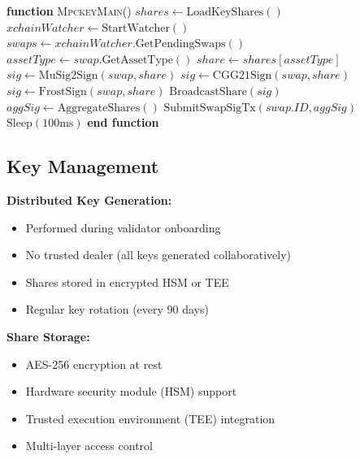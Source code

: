 \documentclass[11pt]{article}
\begin{document}
\begin{algorithmic}[1]
\State \textbf{function} \textsc{MpckeyMain}()
    \State $shares \gets \text{LoadKeyShares}()$
    \State $xchainWatcher \gets \text{StartWatcher}()$
    \State
        \State $swaps \gets xchainWatcher.\text{GetPendingSwaps}()$
            \State $assetType \gets swap.\text{GetAssetType}()$
            \State $share \gets shares[assetType]$
            \State
                \State $sig \gets \text{MuSig2Sign}(swap, share)$
                \State $sig \gets \text{CGG21Sign}(swap, share)$
                \State $sig \gets \text{FrostSign}(swap, share)$
            \EndIf
            \State
            \State $\text{BroadcastShare}(sig)$
            \State
                \State $aggSig \gets \text{AggregateShares}()$
                \State $\text{SubmitSwapSigTx}(swap.ID, aggSig)$
            \EndIf
        \EndFor
        \State $\text{Sleep}(100\text{ms})$
    \EndWhile
\State \textbf{end function}
\end{algorithmic}


\subsection{Key Management}

\textbf{Distributed Key Generation:}
\begin{itemize}
\item Performed during validator onboarding
\item No trusted dealer (all keys generated collaboratively)
\item Shares stored in encrypted HSM or TEE
\item Regular key rotation (every 90 days)
\end{itemize}

\textbf{Share Storage:}
\begin{itemize}
\item AES-256 encryption at rest
\item Hardware security module (HSM) support
\item Trusted execution environment (TEE) integration
\item Multi-layer access control
\end{itemize}
\end{document}
